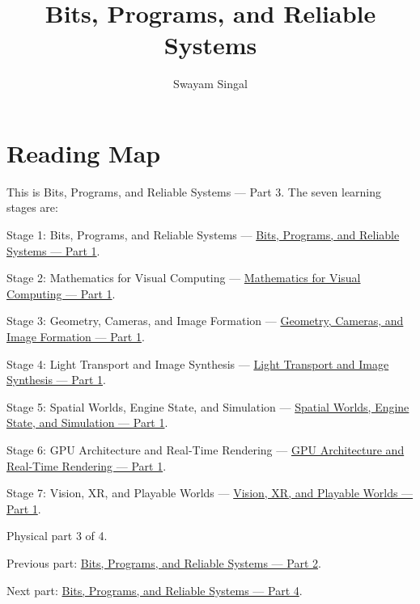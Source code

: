 \documentclass[11pt,twoside,openany]{book}
\title{Bits, Programs, and Reliable Systems}
\author{Swayam Singal}
\begin{document}
\maketitle
\begin{center}\end{center}
\chapter*{Reading Map}
\hypertarget{volume-reading-map}{}
\noindent This is Bits, Programs, and Reliable Systems --- Part 3. The seven learning stages are:
\par\noindent Stage 1: Bits, Programs, and Reliable Systems --- \href{../01-Bits-Programs-and-Reliable-Systems-P01/main.pdf}{Bits, Programs, and Reliable Systems — Part 1}.
\par\noindent Stage 2: Mathematics for Visual Computing --- \href{../02-Mathematics-for-Visual-Computing-P01/main.pdf}{Mathematics for Visual Computing — Part 1}.
\par\noindent Stage 3: Geometry, Cameras, and Image Formation --- \href{../03-Geometry-Cameras-and-Image-Formation-P01/main.pdf}{Geometry, Cameras, and Image Formation — Part 1}.
\par\noindent Stage 4: Light Transport and Image Synthesis --- \href{../04-Light-Transport-and-Image-Synthesis-P01/main.pdf}{Light Transport and Image Synthesis — Part 1}.
\par\noindent Stage 5: Spatial Worlds, Engine State, and Simulation --- \href{../05-Spatial-Worlds-Engine-State-and-Simulation-P01/main.pdf}{Spatial Worlds, Engine State, and Simulation — Part 1}.
\par\noindent Stage 6: GPU Architecture and Real-Time Rendering --- \href{../06-GPU-Architecture-and-Real-Time-Rendering-P01/main.pdf}{GPU Architecture and Real-Time Rendering — Part 1}.
\par\noindent Stage 7: Vision, XR, and Playable Worlds --- \href{../07-Vision-XR-and-Playable-Worlds-P01/main.pdf}{Vision, XR, and Playable Worlds — Part 1}.
\par\noindent Physical part 3 of 4.
\par\noindent Previous part: \href{../01-Bits-Programs-and-Reliable-Systems-P02/main.pdf}{Bits, Programs, and Reliable Systems — Part 2}.
\par\noindent Next part: \href{../01-Bits-Programs-and-Reliable-Systems-P04/main.pdf}{Bits, Programs, and Reliable Systems — Part 4}.
\end{document}
